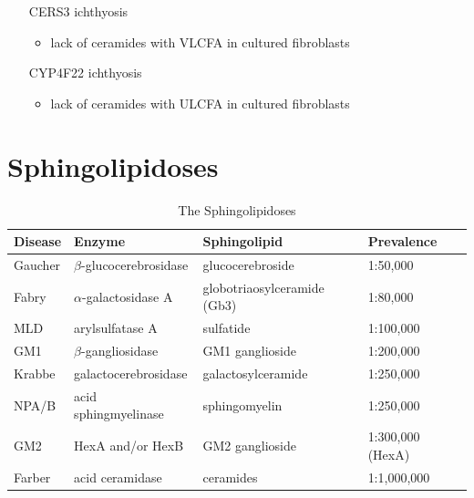 \documentclass{scrartcl}
\begin{document}
\begin{enumerate}
\begin{itemize}
\item[{CERS3}] ichthyosis
\begin{itemize}
\item lack of ceramides with VLCFA in cultured fibroblasts
\end{itemize}
\item[{CYP4F22}] ichthyosis
\begin{itemize}
\item lack of ceramides with ULCFA in cultured fibroblasts
\end{itemize}
\end{itemize}
\end{enumerate}

\section{Sphingolipidoses}
\label{sec:org3963130}

\begin{table}[htbp]
\caption{\label{tab:orgf4b8735}
The Sphingolipidoses}
\centering
\begin{tabular}{llll}
Disease & Enzyme & Sphingolipid & Prevalence\\
\hline
Gaucher & \(\beta\)-glucocerebrosidase & glucocerebroside & 1:50,000\\
Fabry & \(\alpha\)-galactosidase A & globotriaosylceramide (Gb3) & 1:80,000\\
MLD & arylsulfatase A & sulfatide & 1:100,000\\
GM1 & \(\beta\)-gangliosidase & GM1 ganglioside & 1:200,000\\
Krabbe & galactocerebrosidase & galactosylceramide & 1:250,000\\
NPA/B & acid sphingmyelinase & sphingomyelin & 1:250,000\\
GM2 & HexA and/or HexB & GM2 ganglioside & 1:300,000 (HexA)\\
Farber & acid ceramidase & ceramides & 1:1,000,000\\
\end{tabular}
\end{table}
\end{document}
